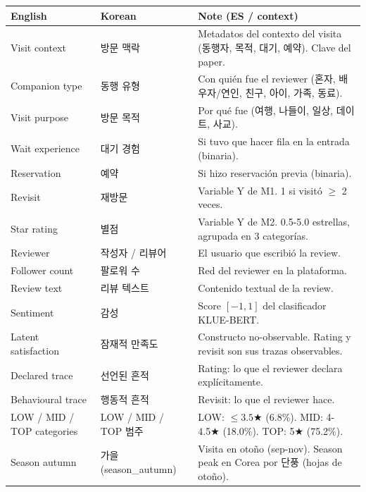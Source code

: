 \documentclass[10pt,a4paper]{article}
\begin{document}
\begin{longtable}{@{}p{3.6cm} p{3.5cm} p{9cm}@{}}
\toprule
\textbf{English} & \textbf{Korean} & \textbf{Note (ES / context)} \\
\midrule
Visit context                & 방문 맥락                       & Metadatos del contexto del visita (동행자, 목적, 대기, 예약). Clave del paper. \\
Companion type               & 동행 유형                       & Con quién fue el reviewer (혼자, 배우자/연인, 친구, 아이, 가족, 동료). \\
Visit purpose                & 방문 목적                       & Por qué fue (여행, 나들이, 일상, 데이트, 사교). \\
Wait experience              & 대기 경험                       & Si tuvo que hacer fila en la entrada (binaria). \\
Reservation                  & 예약                            & Si hizo reservación previa (binaria). \\
Revisit                      & 재방문                           & Variable Y de M1. 1 si visitó $\ge$ 2 veces. \\
Star rating                   & 별점                             & Variable Y de M2. 0.5-5.0 estrellas, agrupada en 3 categorías. \\
Reviewer                      & 작성자 / 리뷰어                   & El usuario que escribió la review. \\
Follower count                & 팔로워 수                         & Red del reviewer en la plataforma. \\
Review text                   & 리뷰 텍스트                        & Contenido textual de la review. \\
Sentiment                     & 감성                              & Score $[-1, 1]$ del clasificador KLUE-BERT. \\
Latent satisfaction           & 잠재적 만족도                     & Constructo no-observable. Rating y revisit son sus trazas observables. \\
Declared trace                & 선언된 흔적                        & Rating: lo que el reviewer declara explícitamente. \\
Behavioural trace             & 행동적 흔적                        & Revisit: lo que el reviewer hace. \\
LOW / MID / TOP categories    & LOW / MID / TOP 범주             & LOW: $\le 3.5$★ (6.8\%). MID: 4-4.5★ (18.0\%). TOP: 5★ (75.2\%). \\
Season autumn                 & 가을 (season\_autumn)             & Visita en otoño (sep-nov). Season peak en Corea por 단풍 (hojas de otoño). \\
\bottomrule
\end{longtable}
\end{document}
